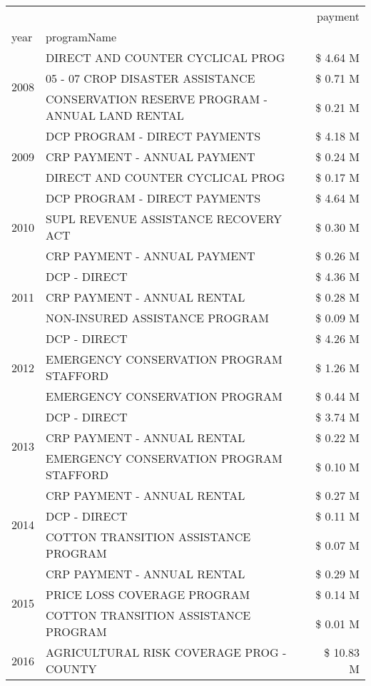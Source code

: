 \begin{tabular}{llr}
\toprule
 &  & payment \\
year & programName &  \\
\midrule
\multirow[t]{3}{*}{2008} & DIRECT AND COUNTER CYCLICAL PROG & \$ 4.64 M \\
 & 05 - 07 CROP DISASTER ASSISTANCE & \$ 0.71 M \\
 & CONSERVATION RESERVE PROGRAM - ANNUAL LAND RENTAL & \$ 0.21 M \\
\cline{1-3}
\multirow[t]{3}{*}{2009} & DCP PROGRAM - DIRECT PAYMENTS & \$ 4.18 M \\
 & CRP PAYMENT - ANNUAL PAYMENT & \$ 0.24 M \\
 & DIRECT AND COUNTER CYCLICAL PROG & \$ 0.17 M \\
\cline{1-3}
\multirow[t]{3}{*}{2010} & DCP PROGRAM - DIRECT PAYMENTS & \$ 4.64 M \\
 & SUPL REVENUE ASSISTANCE RECOVERY ACT & \$ 0.30 M \\
 & CRP PAYMENT - ANNUAL PAYMENT & \$ 0.26 M \\
\cline{1-3}
\multirow[t]{3}{*}{2011} & DCP - DIRECT & \$ 4.36 M \\
 & CRP PAYMENT - ANNUAL RENTAL & \$ 0.28 M \\
 & NON-INSURED ASSISTANCE PROGRAM & \$ 0.09 M \\
\cline{1-3}
\multirow[t]{3}{*}{2012} & DCP - DIRECT & \$ 4.26 M \\
 & EMERGENCY CONSERVATION PROGRAM STAFFORD & \$ 1.26 M \\
 & EMERGENCY CONSERVATION PROGRAM & \$ 0.44 M \\
\cline{1-3}
\multirow[t]{3}{*}{2013} & DCP - DIRECT & \$ 3.74 M \\
 & CRP PAYMENT - ANNUAL RENTAL & \$ 0.22 M \\
 & EMERGENCY CONSERVATION PROGRAM STAFFORD & \$ 0.10 M \\
\cline{1-3}
\multirow[t]{3}{*}{2014} & CRP PAYMENT - ANNUAL RENTAL & \$ 0.27 M \\
 & DCP - DIRECT & \$ 0.11 M \\
 & COTTON TRANSITION ASSISTANCE PROGRAM & \$ 0.07 M \\
\cline{1-3}
\multirow[t]{3}{*}{2015} & CRP PAYMENT - ANNUAL RENTAL & \$ 0.29 M \\
 & PRICE LOSS COVERAGE PROGRAM & \$ 0.14 M \\
 & COTTON TRANSITION ASSISTANCE PROGRAM & \$ 0.01 M \\
\cline{1-3}
\multirow[t]{3}{*}{2016} & AGRICULTURAL RISK COVERAGE PROG - COUNTY & \$ 10.83 M \\

\end{tabular}
